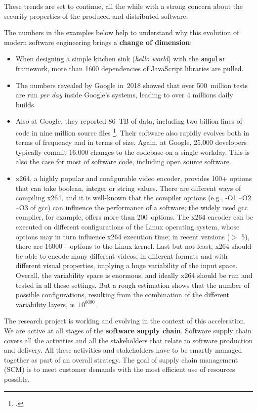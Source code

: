\bigskip\noindent These trends are set to continue, all the while with a strong concern about the security properties of the produced and distributed software. 


\noindent The numbers in the examples below help to understand why this evolution of modern software engineering brings a \textbf{change of dimension}:
\begin{itemize}
	\item When designing a simple kitchen sink (\textit{hello world}) with the {\tt angular} framework, more than 1600 dependencies of JavaScript libraries are pulled. 
	\item  The numbers revealed by Google in~2018 showed that over 500~million tests are run \emph{per day} inside Google’s systems, leading to over 4 millions daily builds.
	\item Also at Google, they reported 86~TB of data, including two billion lines of code in nine million source files \footcite{potvin2016google}. Their software also rapidly evolves both in terms of frequency and in terms of size. Again, at Google, 25,000 developers typically commit 16,000 changes to the codebase on a single workday. This is also the case for most of software code, including open source software. 
	\item  x264, a highly popular and configurable video encoder, provides 100+ options that can take boolean, integer or string values. 
	There are different ways of compiling x264, and it is well-known that the compiler options (e.g., -O1 –O2 –O3 of gcc) can influence the performance of a software; the widely used gcc compiler, for example, offers more than 200~options. 
	The x264 encoder can be executed on different configurations of the Linux operating system, whose options may in turn influence x264 execution time; in recent versions ($>$ 5), there are 16000+ options to the Linux kernel.
	Last but not least, x264 should be able to encode many different videos, in different formats and with different visual properties, implying a
  huge variability of the input space. 
	Overall, the variability space is enormous, and ideally x264 should be run and tested in all these settings. 
	But a rough estimation shows that the number of possible configurations, resulting from the combination of the different variability layers, is~$10^{6000}$. 
    \end{itemize}


The \team{} research project is working and evolving in the context of this acceleration. 
We are active at all stages of the \textbf{software supply chain}.  
Software supply chain covers all the activities and all the stakeholders that relate to software production and delivery.
All these activities and stakeholders have to be smartly managed together as part of an overall strategy.
The goal of supply chain management (SCM) is to meet customer demands with the most efficient use of resources possible. 
 

